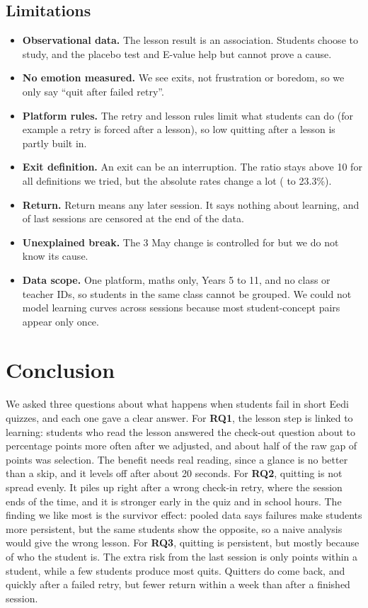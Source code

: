 \documentclass[11pt,a4paper]{article}
\begin{document}
\subsection{Limitations}\label{sec:lim}
\begin{itemize}
\item \textbf{Observational data.} The lesson result is an association. Students choose to study, and the placebo test and E-value help but cannot prove a cause.
\item \textbf{No emotion measured.} We see exits, not frustration or boredom, so we only say ``quit after failed retry''.
\item \textbf{Platform rules.} The retry and lesson rules limit what students can do (for example a retry is forced after a lesson), so low quitting after a lesson is partly built in.
\item \textbf{Exit definition.} An exit can be an interruption. The ratio stays above 10 for all definitions we tried, but the absolute rates change a lot (\qTwoRateFR{} to 23.3\%).
\item \textbf{Return.} Return means any later session. It says nothing about learning, and \qThreeCensored{} of last sessions are censored at the end of the data.
\item \textbf{Unexplained break.} The 3 May change is controlled for but we do not know its cause.
\item \textbf{Data scope.} One platform, maths only, Years 5 to 11, and no class or teacher IDs, so students in the same class cannot be grouped. We could not model learning curves across sessions because most student-concept pairs appear only once.
\end{itemize}

\section{Conclusion}
We asked three questions about what happens when students fail in short Eedi quizzes, and each one gave a clear answer. For \textbf{RQ1}, the lesson step is linked to learning: students who read the lesson answered the check-out question about \qOneEffFE{} to \qOneEffIPW{} percentage points more often after we adjusted, and about half of the raw gap of \qOneEffRaw{} points was selection. The benefit needs real reading, since a glance is no better than a skip, and it levels off after about 20 seconds. For \textbf{RQ2}, quitting is not spread evenly. It piles up right after a wrong check-in retry, where the session ends \qTwoRateFR{} of the time, and it is stronger early in the quiz and in school hours. The finding we like most is the survivor effect: pooled data says failures make students more persistent, but the same students show the opposite, so a naive analysis would give the wrong lesson. For \textbf{RQ3}, quitting is persistent, but mostly because of who the student is. The extra risk from the last session is only \qThreeWithin{} points within a student, while a few students produce most quits. Quitters do come back, and quickly after a failed retry, but fewer return within a week than after a finished session.
\end{document}
